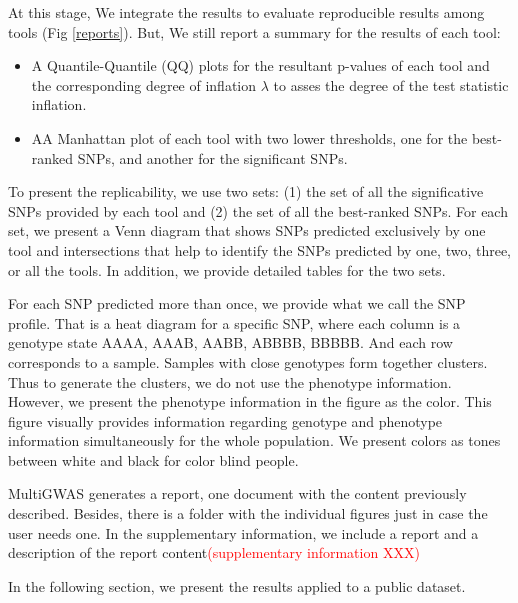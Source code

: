At this stage, We integrate the results to evaluate reproducible results among tools (Fig \ref{reports}). But, We still report a summary for the results of each tool:
\begin{itemize}
    \item A Quantile-Quantile (QQ) plots for the resultant p-values of each tool and the corresponding degree of inflation $\lambda$ to asses the degree of the test statistic inflation.
    \item AA Manhattan plot of each tool with two lower thresholds, one for the best-ranked SNPs, and another for the significant SNPs. 
\end{itemize}

To present the replicability, we use two sets: (1) the set of all the significative SNPs provided by each tool and (2) the set of all the best-ranked SNPs. For each set, we present a Venn diagram that shows SNPs predicted exclusively by one tool and intersections that help to identify the SNPs predicted by one, two, three, or all the tools. In addition, we provide detailed tables for the two sets.

For each SNP predicted more than once, we provide what we call the SNP profile. That is a heat diagram for a specific SNP, where each column is a genotype state AAAA, AAAB, AABB, ABBBB, BBBBB. And each row corresponds to a sample. Samples with close genotypes form together clusters. Thus to generate the clusters, we do not use the phenotype information. However, we present the phenotype information in the figure as the color. This figure visually provides information regarding genotype and phenotype information simultaneously for the whole population. We present colors as tones between white and black for color blind people. 


MultiGWAS generates a report, one document with the content previously described. Besides, there is a folder with the individual figures just in case the user needs one. In the supplementary information, we include a report and a description of the report content\textcolor{red}{(supplementary information XXX)}


In the following section, we present the results applied to a public dataset. 
